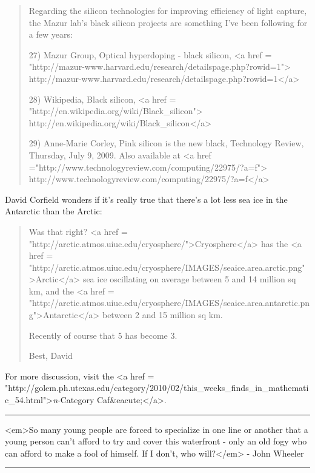 \begin{quote}
Regarding the silicon technologies for improving efficiency of light capture, 
the Mazur lab's black silicon projects are something I've been following for a 
few years:

27) Mazur Group, Optical hyperdoping - black silicon, 
<a href = "http://mazur-www.harvard.edu/research/detailspage.php?rowid=1">
http://mazur-www.harvard.edu/research/detailspage.php?rowid=1</a>

28) Wikipedia, Black silicon, <a href =
"http://en.wikipedia.org/wiki/Black_silicon">
http://en.wikipedia.org/wiki/Black_silicon</a>

29) Anne-Marie Corley, Pink silicon is the new black, Technology
Review, Thursday, July 9, 2009.  Also available at <a href
="http://www.technologyreview.com/computing/22975/?a=f">
http://www.technologyreview.com/computing/22975/?a=f</a>

\end{quote}


David Corfield wonders if it's really true that there's a
lot less sea ice in the Antarctic than the Arctic:

\begin{quote}

Was that right? <a href = "http://arctic.atmos.uiuc.edu/cryosphere/">Cryosphere</a> has the 
<a href = 
"http://arctic.atmos.uiuc.edu/cryosphere/IMAGES/seaice.area.arctic.png">Arctic</a> sea ice oscillating on average between 5 and 14 million sq km, and the
<a href = "http://arctic.atmos.uiuc.edu/cryosphere/IMAGES/seaice.area.antarctic.png">Antarctic</a> between 2 and 15 million sq km.


Recently of course that 5 has become 3.

Best, David

\end{quote}




For more discussion, visit the
<a href = "http://golem.ph.utexas.edu/category/2010/02/this_weeks_finds_in_mathematic_54.html">\emph{n}-Category Caf&eacute;</a>.

\par\noindent\rule{\textwidth}{0.4pt}
<em>So many young people are forced to specialize in one line or another that 
a young person can't afford to try and cover this waterfront - only an old 
fogy who can afford to make a fool of himself.  If I don't, who will?</em> -
John Wheeler

\par\noindent\rule{\textwidth}{0.4pt}

